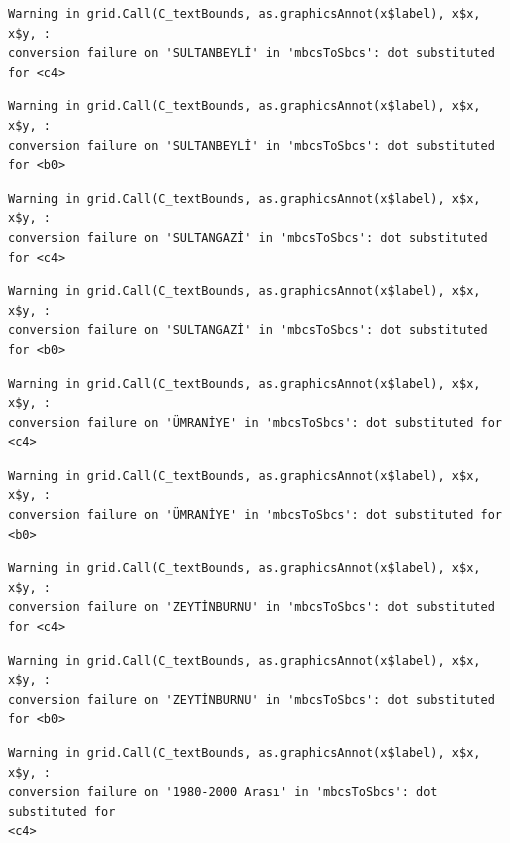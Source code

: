 \documentclass[
  11pt,
  a4paper,
  DIV=11,
  numbers=noendperiod]{scrartcl}
\begin{document}
\begin{verbatim}
Warning in grid.Call(C_textBounds, as.graphicsAnnot(x$label), x$x, x$y, :
conversion failure on 'SULTANBEYLİ' in 'mbcsToSbcs': dot substituted for <c4>
\end{verbatim}

\begin{verbatim}
Warning in grid.Call(C_textBounds, as.graphicsAnnot(x$label), x$x, x$y, :
conversion failure on 'SULTANBEYLİ' in 'mbcsToSbcs': dot substituted for <b0>
\end{verbatim}

\begin{verbatim}
Warning in grid.Call(C_textBounds, as.graphicsAnnot(x$label), x$x, x$y, :
conversion failure on 'SULTANGAZİ' in 'mbcsToSbcs': dot substituted for <c4>
\end{verbatim}

\begin{verbatim}
Warning in grid.Call(C_textBounds, as.graphicsAnnot(x$label), x$x, x$y, :
conversion failure on 'SULTANGAZİ' in 'mbcsToSbcs': dot substituted for <b0>
\end{verbatim}

\begin{verbatim}
Warning in grid.Call(C_textBounds, as.graphicsAnnot(x$label), x$x, x$y, :
conversion failure on 'ÜMRANİYE' in 'mbcsToSbcs': dot substituted for <c4>
\end{verbatim}

\begin{verbatim}
Warning in grid.Call(C_textBounds, as.graphicsAnnot(x$label), x$x, x$y, :
conversion failure on 'ÜMRANİYE' in 'mbcsToSbcs': dot substituted for <b0>
\end{verbatim}

\begin{verbatim}
Warning in grid.Call(C_textBounds, as.graphicsAnnot(x$label), x$x, x$y, :
conversion failure on 'ZEYTİNBURNU' in 'mbcsToSbcs': dot substituted for <c4>
\end{verbatim}

\begin{verbatim}
Warning in grid.Call(C_textBounds, as.graphicsAnnot(x$label), x$x, x$y, :
conversion failure on 'ZEYTİNBURNU' in 'mbcsToSbcs': dot substituted for <b0>
\end{verbatim}

\begin{verbatim}
Warning in grid.Call(C_textBounds, as.graphicsAnnot(x$label), x$x, x$y, :
conversion failure on '1980-2000 Arası' in 'mbcsToSbcs': dot substituted for
<c4>
\end{verbatim}
\end{document}
